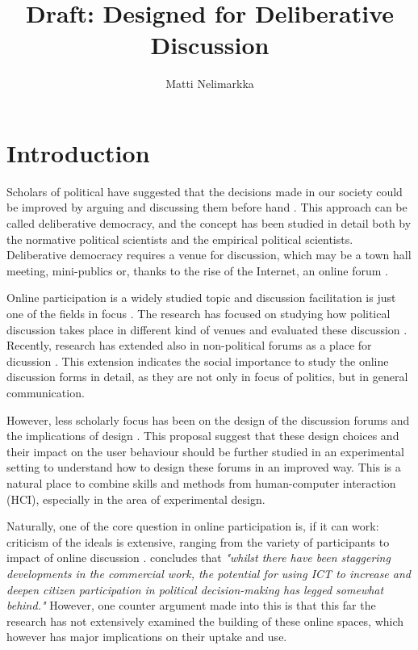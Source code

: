 \documentclass[journal,a4paper]{IEEEtran}
\author{Matti Nelimarkka}
\title{Draft: Designed for Deliberative Discussion}
\begin{document}
\maketitle

\setlength{\parindent}{0pt}
\setlength{\parskip}{.5ex}

\section{Introduction}
Scholars of political have suggested that the decisions made in our society could be improved by arguing and discussing them before hand . This approach can be called deliberative democracy, and the concept has been studied in detail both by the normative political scientists and the empirical political scientists. Deliberative democracy requires a venue for discussion, which may be a town hall meeting, mini-publics or, thanks to the rise of the Internet, an online forum .

Online participation is a widely studied topic and discussion facilitation is just one of the fields in focus . The research has focused on studying how political discussion takes place in different kind of venues  and evaluated these discussion . Recently, research has extended also in non-political forums as a place for dicussion \cite{graham12}. This extension indicates the social importance to study the online discussion forms in detail, as they are not only in focus of politics, but in general communication.

However, less scholarly focus has been on the design of the discussion forums and the implications of design . This proposal suggest that these design choices and their impact on the user behaviour should be further studied in an experimental setting to understand how to design these forums in an improved way. This is a natural place to combine skills and methods from human-computer interaction (HCI), especially in the area of experimental design.

Naturally, one of the core question in online participation is, if it can work: criticism of the ideals is extensive, ranging from the variety of participants to impact of online discussion .  concludes that \textit{"whilst there have been staggering developments in the commercial work, the potential for using ICT to increase and deepen citizen participation in political decision-making has legged somewhat behind."} However, one counter argument made into this is that this far the research has not extensively examined the building of these online spaces, which however has major implications on their uptake and use.
\end{document}
